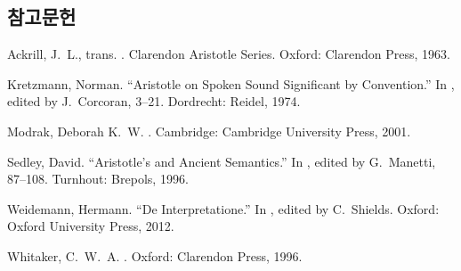 \documentclass[12pt, a4paper]{article}
\begin{document}
\subsection*{참고문헌}
\begin{references}

 Ackrill, J.\ L., trans. . Clarendon Aristotle Series. Oxford: Clarendon Press, 1963.

 Kretzmann, Norman. ``Aristotle on Spoken Sound Significant by Convention.'' In , edited by J.\ Corcoran, 3--21. Dordrecht: Reidel, 1974.

 Modrak, Deborah K.\ W. . Cambridge: Cambridge University Press, 2001.

 Sedley, David. ``Aristotle's  and Ancient Semantics.'' In , edited by G.\ Manetti, 87--108. Turnhout: Brepols, 1996.

 Weidemann, Hermann. ``De Interpretatione.'' In , edited by C.\ Shields. Oxford: Oxford University Press, 2012.

 Whitaker, C.\ W.\ A. . Oxford: Clarendon Press, 1996.

\end{references}
\end{document}
